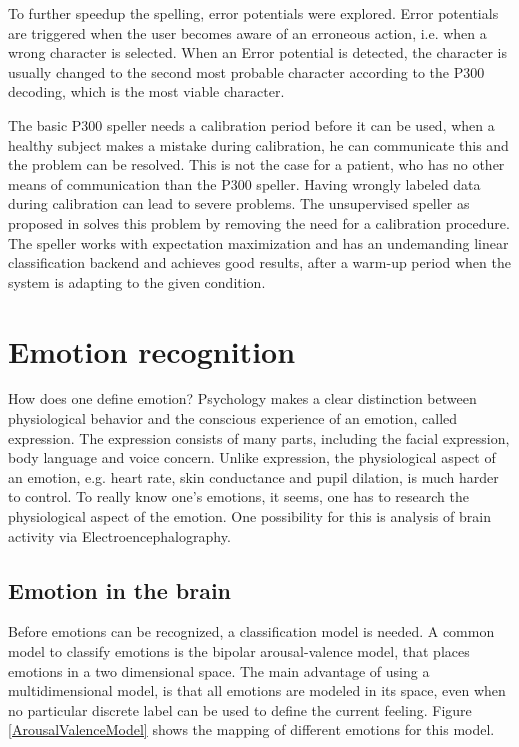To further speedup the spelling, error potentials were explored. Error potentials are triggered when the user becomes aware of an erroneous action\cite{ErrorPotentials}, i.e. when a wrong character is selected. When an Error potential is detected, the character is usually changed to the second most probable character according to the P300 decoding\cite{ErrSecChar}, which is the most viable character.

\clearpage

The basic P300 speller needs a calibration period before it can be used, when a healthy subject makes a mistake during calibration, he can communicate this and the problem can be resolved. This is not the case for a patient, who has no other means of communication than the P300 speller. Having wrongly labeled data during calibration can lead to severe problems. The unsupervised speller as proposed in \cite{P300Unsupervised} solves this problem by removing the need for a calibration procedure. The speller works with expectation maximization and has an undemanding linear classification backend and achieves good results, after a warm-up period when the system is adapting to the given condition.

\section{Emotion recognition}

How does one define emotion? Psychology makes a clear distinction between physiological behavior and the conscious experience of an emotion, called expression\cite{ExtendedPaper}. The expression consists of many parts, including the facial expression, body language and voice concern. Unlike expression, the physiological aspect of an emotion, e.g. heart rate, skin conductance and pupil dilation, is much harder to control. To really know one's emotions, it seems, one has to research the physiological aspect of the emotion. One possibility for this is analysis of brain activity via Electroencephalography\cite{EEGDatasets}.


\subsection{Emotion in the brain}

Before emotions can be recognized, a classification model is needed. A common model to classify emotions is the bipolar arousal-valence model\cite{ExtendedPaper,RealTimeEEGEmotion}, that places emotions in a two dimensional space. The main advantage of using a multidimensional model, is that all emotions are modeled in its space, even when no particular discrete label can be used to define the current feeling. Figure \ref{ArousalValenceModel} shows the mapping of different emotions for this model. 

